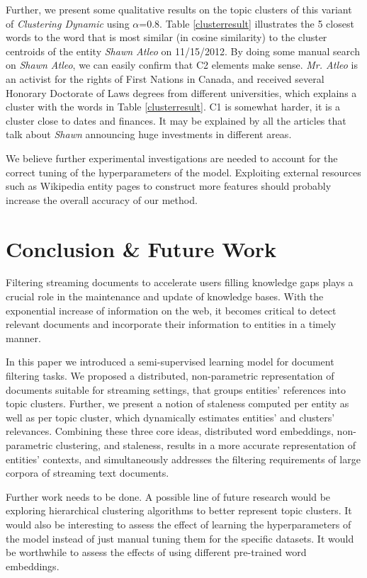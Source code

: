 \documentclass{article}
\begin{document}
{{Further, we present some qualitative results on the topic clusters of this variant of {\textit{Clustering Dynamic}} using $\alpha\mathord{=}0.8$. Table \ref{clusterresult} illustrates the 5 closest words to the word that is most similar (in cosine similarity) to the cluster centroids of the entity \emph{Shawn Atleo} on 11/15/2012.
By doing some manual search on \emph{Shawn Atleo}, we can easily confirm that C2 elements make sense. \emph{Mr. Atleo} is an activist for the rights of First Nations in Canada, and received several Honorary Doctorate of Laws degrees from different universities, which explains a cluster with the words in Table \ref{clusterresult}. C1 is somewhat harder, it is a cluster close to dates and finances. It may be explained by all the articles that talk about \emph{Shawn} announcing huge investments in different areas.

We believe further experimental investigations are needed to account for the correct tuning of the hyperparameters of the model. Exploiting external resources such as Wikipedia entity pages to construct more features \cite{xitong12} should probably increase the overall accuracy of our method. 

\section{Conclusion \& Future Work}
\label{conclusion}

Filtering streaming documents to accelerate users filling knowledge gaps plays a crucial role in the maintenance and update of knowledge bases.
With the exponential increase of information on the web, it becomes critical to detect relevant documents and incorporate their information to entities in a timely manner. %

In this paper we introduced a semi-supervised learning model for document filtering tasks. We proposed a distributed, non-parametric representation of documents suitable for streaming settings, that groups entities' references into topic clusters. Further, we present a notion of staleness computed per entity as well as per topic cluster, which dynamically estimates entities' and clusters' relevances.
Combining these three core ideas, distributed word embeddings, non-parametric clustering, and staleness, results in a more accurate representation of entities' contexts, and simultaneously addresses the filtering requirements of large corpora of streaming text documents.

Further work needs to be done. A possible line of future research would be exploring hierarchical clustering algorithms to better represent topic clusters. It would also be interesting to assess the effect of learning the hyperparameters of the model instead of just manual tuning them for the specific datasets.
It would be worthwhile to assess the effects of using different pre-trained word embeddings.

}}
\end{document}
